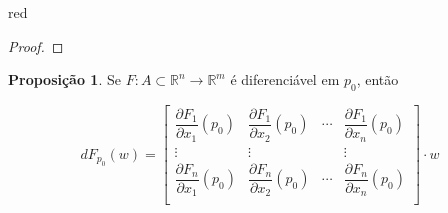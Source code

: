 \documentclass[12pt,leqno,twoside]{amsart}
\theoremstyle{definition}
\newtheorem{proposicao}{Proposição}[section]
\begin{document}
\begin{color}{red}
\begin{proof}
\end{proof}

\vspace{0.3cm}

\begin{proposicao}
	Se $F:A\subset \mathbb{R}^n \to \mathbb{R}^m$ é diferenciável em $p_0$, então

\vspace{0.3cm}

	$$ dF_{p_0}(w) = \left[\begin{array}{cccc} \dfrac{\partial F_1}{\partial x_1} (p_0)& \dfrac{\partial F_1}{\partial x_2} (p_0)& \cdots& \dfrac{\partial F_1}{\partial x_n} (p_0) \\  \vdots &\vdots&&\vdots\\ \dfrac{\partial F_n}{\partial x_1} (p_0)& \dfrac{\partial F_n}{\partial x_2} (p_0)& \cdots& \dfrac{\partial F_n}{\partial x_n} (p_0) \\  \end{array} \right]\cdot w$$

\end{proposicao}

\vspace{0.3cm}


\end{color}
\end{document}
